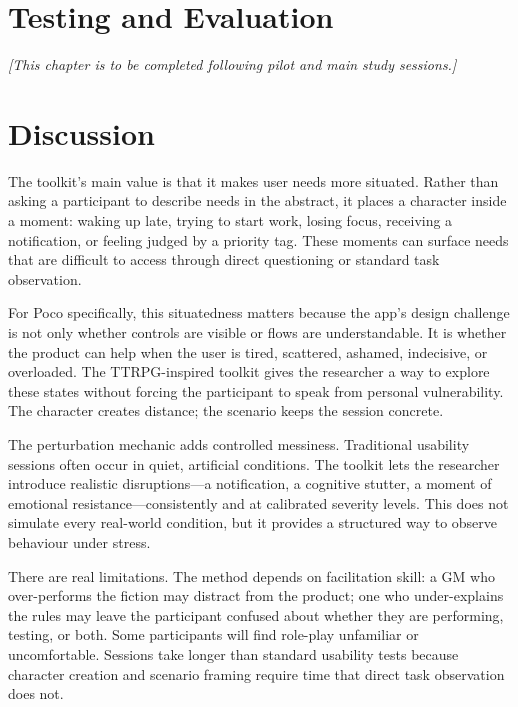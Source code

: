 \documentclass[12pt,a4paper]{report}
\begin{document}
\chapter{Testing and Evaluation}

\textit{[This chapter is to be completed following pilot and main study sessions.]}

\chapter{Discussion}

The toolkit's main value is that it makes user needs more situated.
Rather than asking a participant to describe needs in the abstract, it places a character
inside a moment: waking up late, trying to start work, losing focus, receiving a
notification, or feeling judged by a priority tag.
These moments can surface needs that are difficult to access through direct questioning
or standard task observation.

For Poco specifically, this situatedness matters because the app's design challenge is
not only whether controls are visible or flows are understandable.
It is whether the product can help when the user is tired, scattered, ashamed,
indecisive, or overloaded.
The TTRPG-inspired toolkit gives the researcher a way to explore these states without
forcing the participant to speak from personal vulnerability.
The character creates distance; the scenario keeps the session concrete.

The perturbation mechanic adds controlled messiness.
Traditional usability sessions often occur in quiet, artificial conditions.
The toolkit lets the researcher introduce realistic disruptions---a notification, a
cognitive stutter, a moment of emotional resistance---consistently and at calibrated
severity levels.
This does not simulate every real-world condition, but it provides a structured way to
observe behaviour under stress.

There are real limitations.
The method depends on facilitation skill: a GM who over-performs the fiction may distract
from the product; one who under-explains the rules may leave the participant confused
about whether they are performing, testing, or both.
Some participants will find role-play unfamiliar or uncomfortable.
Sessions take longer than standard usability tests because character creation and scenario
framing require time that direct task observation does not.
\end{document}

